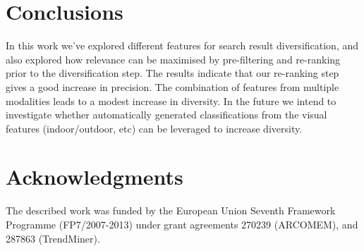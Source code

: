 \documentclass{../acm_proc_article-me11_tweaked}
\begin{document}
\section{Conclusions}
In this work we've explored different features for search result diversification, and also explored how relevance can be maximised by pre-filtering and re-ranking prior to the diversification step. The results indicate that our re-ranking step gives a good increase in precision. The combination of features from multiple modalities leads to a modest increase in diversity. In the future we intend to investigate whether automatically generated classifications from the visual features (indoor/outdoor, etc) can be leveraged to increase diversity.

\section{Acknowledgments}
The described work was funded by the European Union Seventh Framework Programme (FP7/2007-2013) under grant agreements 270239 (ARCOMEM), and 287863 (TrendMiner).



\end{document}
